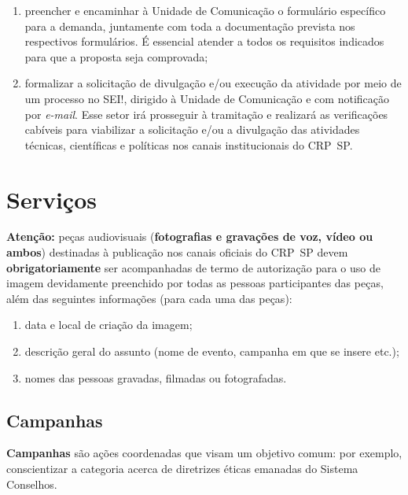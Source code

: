 \begin{enumerate}

  \item
        preencher e encaminhar à Unidade de Comunicação o formulário
        específico para a demanda, juntamente com toda a documentação prevista
        nos respectivos formulários. É essencial atender a todos os requisitos
        indicados para que a proposta seja comprovada;
  \item
        formalizar a solicitação de divulgação e/ou execução da atividade por
        meio de um processo no SEI!, dirigido à Unidade de Comunicação e com
        notificação por \emph{e-mail}. Esse setor irá prosseguir à tramitação
        e realizará as verificações cabíveis para viabilizar a solicitação
        e/ou a divulgação das atividades técnicas, científicas e políticas nos
        canais institucionais do CRP~SP.
\end{enumerate}

\section{Serviços}

\textbf{Atenção:} peças audiovisuais (\textbf{fotografias e gravações de
  voz, vídeo ou ambos}) destinadas à publicação nos canais oficiais do
CRP~SP devem \textbf{obrigatoriamente} ser acompanhadas de termo de
autorização para o uso de imagem devidamente preenchido por todas as
pessoas participantes das peças, além das seguintes informações (para
cada uma das peças):

\begin{enumerate}

  \item
        data e local de criação da imagem;
  \item
        descrição geral do assunto (nome de evento, campanha em que se insere
        etc.);
  \item
        nomes das pessoas gravadas, filmadas ou fotografadas.
\end{enumerate}

\subsection{Campanhas}

\textbf{Campanhas} são ações coordenadas que visam um objetivo comum:
por exemplo, conscientizar a categoria acerca de diretrizes éticas
emanadas do Sistema Conselhos.

